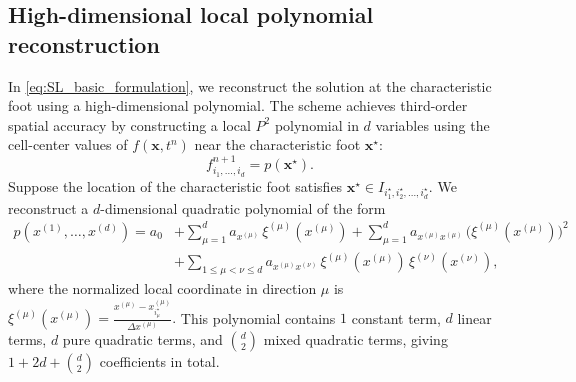 \documentclass{article}
\theoremstyle{plain}
\theoremstyle{definition}
\theoremstyle{remark}
\begin{document}
\subsection{High-dimensional local polynomial reconstruction}
\label{sec:poly_rec}

In \eqref{eq:SL_basic_formulation}, we reconstruct the solution at the characteristic foot using a high-dimensional polynomial. The scheme achieves third-order spatial accuracy by constructing a local $P^2$ polynomial in $d$ variables using the cell-center values of $ f(\bm{x}, t^n) $ near the characteristic foot $ \bm{x}^\star $:
\begin{equation}\label{eq:SL-FD_solver}
    f^{n+1}_{i_1,\ldots,i_d} = p(\bm{x}^\star).
\end{equation}
Suppose the location of the characteristic foot satisfies $\bm{x}^\star \in I_{i_1^\star,i_2^\star,\ldots,i_d^\star}$. We reconstruct a $d$-dimensional quadratic polynomial of the form
\begin{equation}\label{eq:P2_ddim}
\begin{split}
    p(x^{(1)},\ldots,x^{(d)}) = a_0 &+ \sum_{\mu=1}^d a_{x^{(\mu)}} \, \xi^{(\mu)}(x^{(\mu)}) + \sum_{\mu=1}^d a_{x^{(\mu)} x^{(\mu)}} \, \bigl( \xi^{(\mu)}(x^{(\mu)}) \bigr)^2 \\
    &+ \sum_{1 \leq \mu < \nu \leq d} a_{x^{(\mu)}x^{(\nu)}} \, \xi^{(\mu)}(x^{(\mu)}) \, \xi^{(\nu)}(x^{(\nu)}),
\end{split}
\end{equation}
where the normalized local coordinate in direction $\mu$ is
\(
    \xi^{(\mu)}(x^{(\mu)}) = \frac{x^{(\mu)} - x^{(\mu)}_{i^\star_\mu}}{\Delta x^{(\mu)}}.
\)
This polynomial contains $1$ constant term, $d$ linear terms, $d$ pure quadratic terms, and $\binom{d}{2}$ mixed quadratic terms, giving $1 + 2d + \binom{d}{2}$ coefficients in total.
\end{document}
